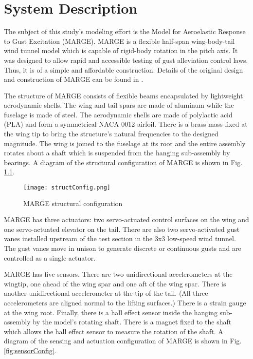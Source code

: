 \chapter{System Description}
\label{ch:sysDescription}

The subject of this study's modeling effort is the Model for Aeroelastic Response to Gust Excitation (MARGE). MARGE is a flexible half-span wing-body-tail wind tunnel model which is capable of rigid-body rotation in the pitch axis. It was designed to allow rapid and accessible testing of gust alleviation control laws. Thus, it is of a simple and affordable construction. Details of the original design and construction of MARGE can be found in \cite{Quenzer2019}.

The structure of MARGE consists of flexible beams encapsulated by lightweight aerodynamic shells. The wing and tail spars are made of aluminum while the fuselage is made of steel. The aerodynamic shells are made of polylactic acid (PLA) and form a symmetrical NACA 0012 airfoil. There is a brass mass fixed at the wing tip to bring the structure's natural frequencies to the designed magnitude. The wing is joined to the fuselage at its root and the entire assembly rotates about a shaft which is suspended from the hanging sub-assembly by bearings. A diagram of the structural configuration of MARGE is shown in Fig. \ref{fig:structureConfig}.
\begin{figure}[h]
    \centering
    \texttt{[image: structConfig.png]}
    \caption{MARGE structural configuration}
    \label{fig:structureConfig}
\end{figure}

MARGE has three actuators: two servo-actuated control surfaces on the wing and one servo-actuated elevator on the tail. There are also two servo-activated gust vanes installed upstream of the test section in the 3x3 low-speed wind tunnel. The gust vanes move in unison to generate discrete or continuous gusts and are controlled as a single actuator.

MARGE has five sensors. There are two unidirectional accelerometers at the wingtip, one ahead of the wing spar and one aft of the wing spar. There is another unidirectional accelerometer at the tip of the tail. (All three accelerometers are aligned normal to the lifting surfaces.) There is a strain gauge at the wing root. Finally, there is a hall effect sensor inside the hanging sub-assembly by the model's rotating shaft. There is a magnet fixed to the shaft which allows the hall effect sensor to measure the rotation of the shaft. A diagram of the sensing and actuation configuration of MARGE is shown in Fig. \ref{fig:sensorConfig}.

